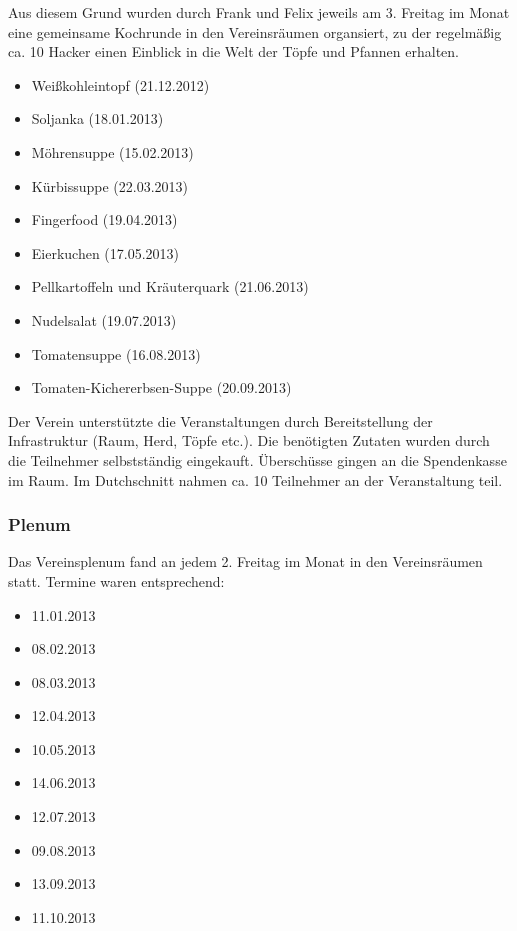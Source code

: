 \documentclass[10pt,DIV16]{scrartcl}
\begin{document}
Aus diesem Grund wurden durch Frank und Felix jeweils am 3. Freitag
im Monat eine gemeinsame Kochrunde in den Vereinsräumen organsiert,
zu der regelmäßig ca. 10 Hacker einen Einblick in die Welt der Töpfe
und Pfannen erhalten.

\begin{itemize}
	\item Weißkohleintopf (21.12.2012)
	\item Soljanka (18.01.2013)
	\item Möhrensuppe (15.02.2013)
	\item Kürbissuppe (22.03.2013)
	\item Fingerfood (19.04.2013)
	\item Eierkuchen (17.05.2013)
	\item Pellkartoffeln und Kräuterquark (21.06.2013)
	\item Nudelsalat (19.07.2013)
	\item Tomatensuppe (16.08.2013)
	\item Tomaten-Kichererbsen-Suppe (20.09.2013)
\end{itemize}

Der Verein unterstützte die Veranstaltungen durch Bereitstellung der
Infrastruktur (Raum, Herd, Töpfe etc.). Die benötigten Zutaten wurden
durch die Teilnehmer selbstständig eingekauft. Überschüsse gingen an
die Spendenkasse im Raum. Im Dutchschnitt nahmen ca. 10 Teilnehmer an
der Veranstaltung teil.

\subsubsection{Plenum}

Das Vereinsplenum fand an jedem 2. Freitag im Monat in den
Vereinsräumen statt. Termine waren entsprechend:

\begin{itemize}
	\item 11.01.2013
	\item 08.02.2013
	\item 08.03.2013
	\item 12.04.2013
	\item 10.05.2013
	\item 14.06.2013
	\item 12.07.2013
	\item 09.08.2013
	\item 13.09.2013
	\item 11.10.2013
\end{itemize}
\end{document}
